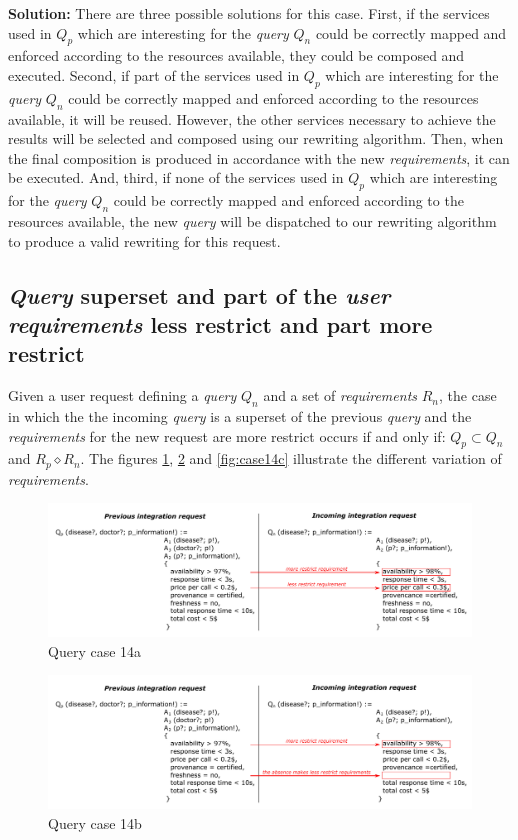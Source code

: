 \bigskip
\noindent \textbf{Solution:} There are three possible solutions for this case. First, if the services used in $Q_{p}$ which are interesting for the \textsl{query} $Q_{n}$ could be correctly mapped and enforced according to the resources available, they could be composed and executed. Second, if part of the services  used in $Q_{p}$ which are interesting for the \textsl{query} $Q_{n}$ could be correctly mapped and enforced according to the resources available, it will be reused. However, the other services necessary to achieve the results will be selected and composed using our rewriting algorithm. Then, when the final composition is produced in accordance with the new \textsl{requirements}, it can be executed. And, third, if none of the services used in $Q_{p}$ which are interesting for the \textsl{query} $Q_{n}$ could be correctly mapped and enforced according to the resources available, the new \textsl{query} will be dispatched to our rewriting algorithm to produce a valid rewriting for this request.

\subsection{\textsl{Query} superset and part of the \textsl{user requirements} less restrict and part more restrict}
Given a user request defining a \textsl{query} $Q_{n}$ and a set of \textsl{requirements} $R_{n}$, the case in which the the incoming \textsl{query} is a superset of the previous \textsl{query} and the \textsl{requirements} for the new request are more restrict occurs if and only if: $Q_{p} \subset Q_{n}$ and $R_{p} \diamond R_{n}$. The figures \ref{fig:case14a}, \ref{fig:case14b} and \ref{fig:case14c} illustrate the different variation of \textsl{requirements}.

\begin{figure}[h!]
\center
\includegraphics[scale=0.85]{figures/query-case-14a.pdf}\caption{Query case 14a} \label{fig:case14a}
\end{figure}

\begin{figure}[h!]
\center
\includegraphics[scale=0.85]{figures/query-case-14b.pdf}\caption{Query case 14b} \label{fig:case14b}
\end{figure}

